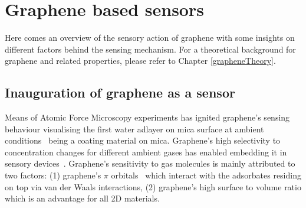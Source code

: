\chapter{Graphene based sensors}
\label{grapheneSensors}

Here comes an overview of the sensory action of graphene with some insights on different factors behind the sensing mechanism. For a theoretical background for graphene and related properties, please refer to Chapter \ref{grapheneTheory}.
\section{Inauguration of graphene as a sensor}
Means of Atomic Force Microscopy experiments has ignited graphene's sensing behaviour visualising the first water adlayer on mica surface at ambient conditions~\cite{Xu2010} being a coating material on mica. Graphene's high selectivity to concentration changes for different ambient gases has enabled embedding it in sensory devices~\cite{Schedin2007, Yuan2013, Melios2017}. Graphene's sensitivity to gas molecules is mainly attributed to two factors: (1) graphene's $\pi$ orbitals~\cite{Neto2009} which interact with the adsorbates residing on top via van der Waals interactions, (2) graphene's high surface to volume ratio which is an advantage for all 2D materials. 

